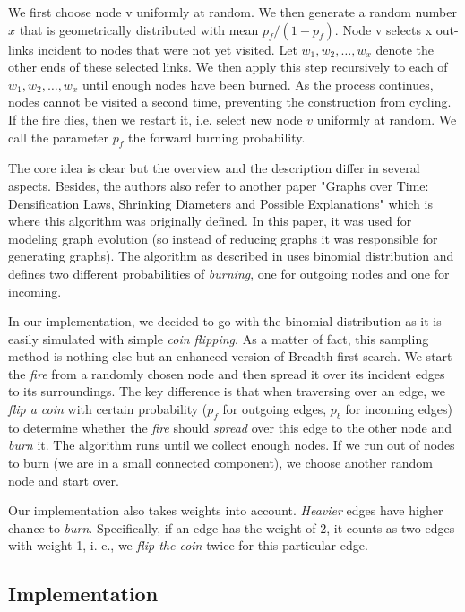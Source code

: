 \begin{displayquote}
We first choose node v uniformly at random. We then generate a random number $x$ that is geometrically distributed with mean $p_f/(1-p_f)$. Node v selects x out-links incident to nodes that were not yet visited. Let $w_1 , w_2 , \ldots, w_x$ denote the other ends of these selected links. We then apply this step recursively to each of $w_1, w_2, \ldots, w_x$ until enough nodes have been burned. As the process continues, nodes cannot be visited a second time, preventing the construction from cycling. If the fire dies, then we restart it, i.e. select new node $v$ uniformly at random. We call the parameter $p_f$ the forward burning probability.
\end{displayquote}

The core idea is clear but the overview and the description differ in several aspects. Besides, the authors also refer to another paper "Graphs over Time: Densification Laws, Shrinking Diameters and Possible Explanations" \cite{leskovec2005graphs} which is where this algorithm was originally defined. In this paper, it was used for modeling graph evolution (so instead of reducing graphs it was responsible for generating graphs). The algorithm as described in \cite{leskovec2005graphs} uses binomial distribution and defines two different probabilities of \emph{burning}, one for outgoing nodes and one for incoming.

In our implementation, we decided to go with the binomial distribution as it is easily simulated with simple \emph{coin flipping}. As a matter of fact, this sampling method is nothing else but an enhanced version of Breadth-first search. We start the \emph{fire} from a randomly chosen node and then spread it over its incident edges to its surroundings. The key difference is that when traversing over an edge, we \emph{flip a coin} with certain probability ($p_f$ for outgoing edges, $p_b$ for incoming edges) to determine whether the \emph{fire} should \emph{spread} over this edge to the other node and \emph{burn} it. The algorithm runs until we collect enough nodes. If we run out of nodes to burn (we are in a small connected component), we choose another random node and start over.

Our implementation also takes weights into account. \emph{Heavier} edges have higher chance to \emph{burn}. Specifically, if an edge has the weight of 2, it counts as two edges with weight 1, i. e., we \emph{flip the coin} twice for this particular edge.

\subsection{Implementation}

